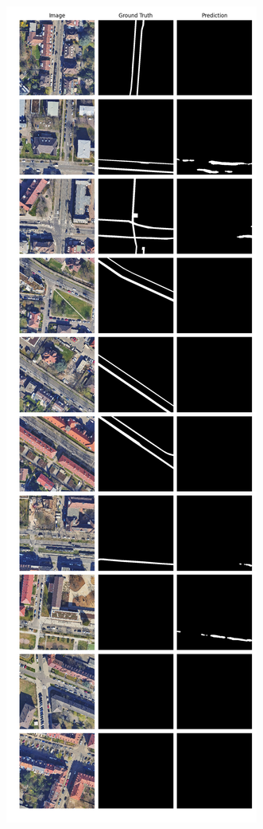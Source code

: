 	\begin{figure}
	\centering
	\begin{subfigure}{.4\textwidth}
		\centering
		\includegraphics[width=1.\textwidth]{Bilder/Samples-KA/bunet15-s.png} 

\end{subfigure}
\end{figure}
